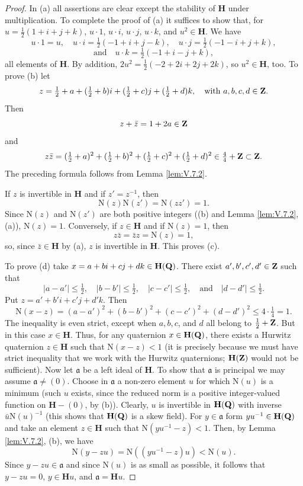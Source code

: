 \begin{proof}
In (a) all assertions are clear except the stability of $\mathbf{H}$ under
multiplication. To complete the proof of (a) it suffices to show that, for
$u=\frac{1}{2}(1+i+j+k)$, $u\cdot1$, $u\cdot i$, $u\cdot j$, $u\cdot k$, and
$u^{2}\in\mathbf{H}$. We have
\[
u\cdot1=u,\quad u\cdot i=\tfrac{1}{2}(-1+i+j-k),\quad
u\cdot j=\tfrac{1}{2}(-1-i+j+k),
\]
\[
\text{and}\quad u\cdot k=\tfrac{1}{2}(-1+i-j+k),
\]
all elements of $\mathbf{H}$. By addition,
$2u^{2}=\frac{1}{2}(-2+2i+2j+2k)$, so $u^{2}\in\mathbf{H}$, too. To prove
(b) let
\[
z=\tfrac{1}{2}+a+(\tfrac{1}{2}+b)i+(\tfrac{1}{2}+c)j+(\tfrac{1}{2}+d)k,
\quad\text{with } a,b,c,d\in\mathbf{Z}.
\]
Then
\[
z+\bar z=1+2a\in\mathbf{Z}
\]
and
\[
z\bar z=(\tfrac{1}{2}+a)^{2}+(\tfrac{1}{2}+b)^{2}
+(\tfrac{1}{2}+c)^{2}+(\tfrac{1}{2}+d)^{2}
\in\tfrac{4}{4}+\mathbf{Z}\subset\mathbf{Z}.
\]
The preceding formula follows from Lemma \ref{lem:V.7.2}.

If $z$ is invertible in $\mathbf{H}$ and if $z'=z^{-1}$, then
\[
\mathrm{N}(z)\mathrm{N}(z')=\mathrm{N}(zz')=1.
\]
Since $\mathrm{N}(z)$ and $\mathrm{N}(z')$ are both positive integers ((b)
and Lemma \ref{lem:V.7.2}, (a)), $\mathrm{N}(z)=1$. Conversely, if
$z\in\mathbf{H}$ and if $\mathrm{N}(z)=1$, then
\[
z\bar z=\bar z z=\mathrm{N}(z)=1,
\]
so, since $\bar z\in\mathbf{H}$ by (a), $z$ is invertible in
$\mathbf{H}$. This proves (c).

To prove (d) take $x=a+bi+cj+dk\in\mathbf{H}(\mathbf{Q})$. There exist
$a',b',c',d'\in\mathbf{Z}$ such that
\[
|a-a'|\leq\tfrac{1}{2},\quad |b-b'|\leq\tfrac{1}{2},\quad
|c-c'|\leq\tfrac{1}{2},\quad\text{and}\quad |d-d'|\leq\tfrac{1}{2}.
\]
Put $z=a'+b'i+c'j+d'k$. Then
\[
\mathrm{N}(x-z)=(a-a')^{2}+(b-b')^{2}+(c-c')^{2}+(d-d')^{2}
\leq4\cdot\tfrac{1}{4}=1.
\]
The inequality is even strict, except when $a,b,c$, and $d$ all belong to
$\frac{1}{2}+\mathbf{Z}$. But in this case $x\in\mathbf{H}$. Thus, for any quaternion
$x\in\mathbf{H}(\mathbf{Q})$, there exists a Hurwitz quaternion
$z\in\mathbf{H}$ such that $\mathrm{N}(x-z)<1$ (it is precisely because we
must have strict inequality that we work with the Hurwitz quaternions;
$\mathbf{H}(\mathbf{Z})$ would not be sufficient). Now let $\mathfrak{a}$ be a left
ideal of $\mathbf{H}$. To show that $\mathfrak{a}$ is principal we may
assume $\mathfrak{a}\neq(0)$. Choose in $\mathfrak{a}$ a non-zero element
$u$ for which $\mathrm{N}(u)$ is a minimum (such $u$ exists, since the
reduced norm is a positive integer-valued function on
$\mathbf{H}-(0)$, by (b)). Clearly, $u$ is invertible in $\mathbf{H}(\mathbf{Q})$
with inverse $\bar u\mathrm{N}(u)^{-1}$ (this shows that $\mathbf{H}(\mathbf{Q})$ is
a skew field). For $y\in\mathfrak{a}$ form
$yu^{-1}\in\mathbf{H}(\mathbf{Q})$ and take an element $z\in\mathbf{H}$ such that
$\mathrm{N}(yu^{-1}-z)<1$. Then, by Lemma \ref{lem:V.7.2}, (b), we have
\[
\mathrm{N}(y-zu)=\mathrm{N}((yu^{-1}-z)u)<\mathrm{N}(u).
\]
Since $y-zu\in\mathfrak{a}$ and since $\mathrm{N}(u)$ is as small as
possible, it follows that $y-zu=0$, $y\in\mathbf{H}u$, and
$\mathfrak{a}=\mathbf{H}u$.
\end{proof}

